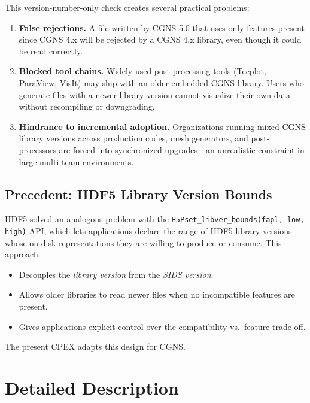 \documentclass[11pt,letterpaper]{article}
\begin{document}
This version-number-only check creates several practical problems:

\begin{enumerate}[leftmargin=2em]
\item \textbf{False rejections.}
  A file written by CGNS 5.0 that uses only features present since
  CGNS 4.x will be rejected by a CGNS 4.x library, even though it
  could be read correctly.

\item \textbf{Blocked tool chains.}
  Widely-used post-processing tools (Tecplot, ParaView, VisIt) may
  ship with an older embedded CGNS library.  Users who generate files
  with a newer library version cannot visualize their own data without
  recompiling or downgrading.

\item \textbf{Hindrance to incremental adoption.}
  Organizations running mixed CGNS library versions across production
  codes, mesh generators, and post-processors are forced into
  synchronized upgrades---an unrealistic constraint in large
  multi-team environments.
\end{enumerate}

\subsection{Precedent: HDF5 Library Version Bounds}

HDF5 solved an analogous problem with the
\texttt{H5Pset\_libver\_bounds(fapl, low, high)} API, which lets
applications declare the range of HDF5 library versions whose on-disk
representations they are willing to produce or consume.  This approach:

\begin{itemize}[leftmargin=2em]
\item Decouples the \emph{library version} from the \emph{SIDS
  version}.
\item Allows older libraries to read newer files when no incompatible
  features are present.
\item Gives applications explicit control over the compatibility
  vs.\ feature trade-off.
\end{itemize}

The present CPEX adapts this design for CGNS.

\section{Detailed Description}
\end{document}
